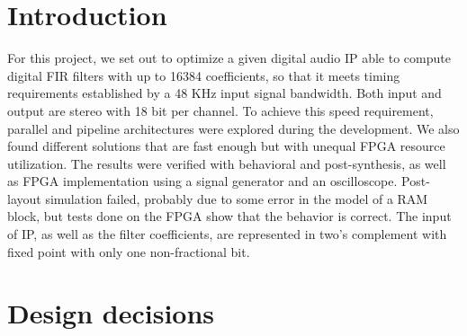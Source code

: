 \documentclass[12pt]{article}
\begin{document}
{
	
	\pagestyle{empty}
	\titleAT
	\newpage
}
\setcounter{page}{1}

\section{Introduction}

For this project, we set out to optimize a given digital audio IP able to compute digital FIR
filters with up to 16384 coefficients, so that it meets timing requirements established by a 48 KHz
input signal bandwidth. Both input and output are stereo with 18 bit per channel. To achieve this
speed requirement, parallel and pipeline architectures were explored during the development. We also
found different solutions that are fast enough but with unequal FPGA resource utilization. The
results were verified with behavioral and post-synthesis, as well as FPGA implementation using a
signal generator and an oscilloscope. Post-layout simulation failed, probably due to some error in
the model of a RAM block, but tests done on the FPGA show that the behavior is correct.
The input of IP, as well as the filter coefficients, are represented in two's complement with fixed
point with only one non-fractional bit. 

\section{Design decisions}
\end{document}
